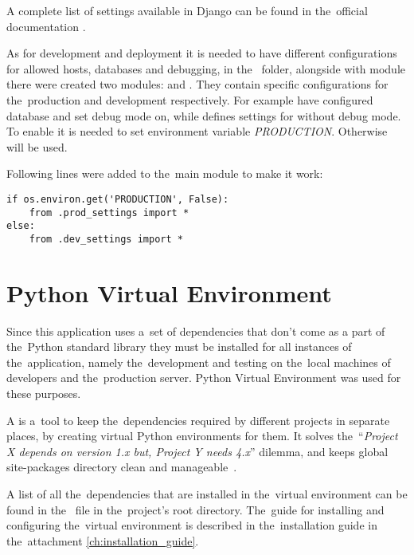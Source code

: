 A complete list of settings available in Django can be found in the~official documentation \cite{djangosettings}.

As for development and deployment it is needed to have different confi\-gurations for allowed hosts, databases and
debugging, in the~ folder, alongside with  module there were created two modules:
 and . They contain specific configurations for the~production and
development respectively. For example  have configured  database and set debug mode on,
while  defines settings for  without debug mode. To enable 
it is needed to set environment variable \textit{PRODUCTION}. Otherwise  will be used.

Following lines were added to the~main  module to make it work:

\begin{lstlisting}
if os.environ.get('PRODUCTION', False):
    from .prod_settings import *
else:
    from .dev_settings import *
\end{lstlisting}



\section{Python Virtual Environment}
Since this application uses a~set of dependencies that don’t come as a part of the~Python standard library they must be
installed for all instances of the~application, namely the~development and testing on the~local machines of developers
and the~production server. Python Virtual Environment was used for these purposes.

A  is a~tool to keep the~dependencies required by different projects in separate places,
by creating virtual Python environments for them. It solves the~“\textit{Project X depends on version 1.x but, Project Y
needs 4.x}” dilemma, and keeps global site-packages directory clean and manageable~\cite{pythonvenv}.

A list of all the~dependencies that are installed in the~virtual environment can be found in the~
file in the~project's root directory. The~guide for installing and configuring the~virtual environment is described in
the~installation guide in the~attachment \ref{ch:installation_guide}.
